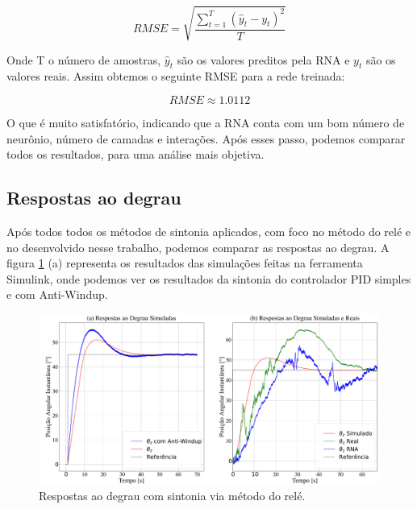 \begin{equation}
RMSE = \sqrt{\frac{\sum_{t=1}^{T}(\hat{y}_t-y_t)^2}{T}}
\end{equation}

Onde T o número de amostras, $\hat{y}_t$ são os valores preditos pela RNA e $y_t$ são os valores reais. Assim obtemos o seguinte RMSE para a rede treinada:

\begin{equation}
RMSE \approx 1.0112
\end{equation}

O que é muito satisfatório, indicando que a RNA conta com um bom número de neurônio, número de camadas e interações. Após esses passo, podemos comparar todos os resultados, para uma análise mais objetiva. 



\subsection{Respostas ao degrau}

Após todos todos os métodos de sintonia aplicados, com foco no método do relé e no desenvolvido nesse trabalho, podemos comparar as respostas ao degrau. A figura \ref{fig:pid_result} (a) representa os resultados das simulações feitas na ferramenta Simulink, onde podemos ver os resultados da sintonia do controlador PID simples e com Anti-Windup.

\begin{figure}[H]
  \caption{Respostas ao degrau com sintonia via método do relé.}
  \begin{center}
      \includegraphics[scale=0.25]{resultados/img/pid_result}
  \end{center}
  \label{fig:pid_result}
\end{figure}


